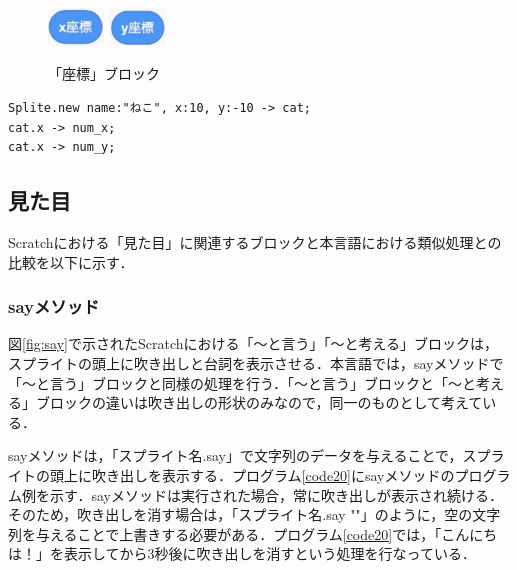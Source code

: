 \documentclass[10pt,a4j]{ltjsarticle}
\begin{document}
\begin{figure}[H]
  \centering
  \includegraphics[height=10mm]{images/x.pdf} 
  \includegraphics[height=10mm]{images/y.pdf} 
  \caption{「座標」ブロック}
  \label{fig:xy}
\end{figure}

\begin{lstlisting}[caption=xメソッドとyメソッドのプログラム例, label=code19]
Splite.new name:"ねこ", x:10, y:-10 -> cat;
cat.x -> num_x;
cat.x -> num_y;
\end{lstlisting}
\subsection{見た目}
Scratchにおける「見た目」に関連するブロックと本言語における類似処理との比較を以下に示す．

\subsubsection{sayメソッド}
図\ref{fig:say}で示されたScratchにおける「〜と言う」「〜と考える」ブロックは，スプライトの頭上に吹き出しと台詞を表示させる．本言語では，sayメソッドで「〜と言う」ブロックと同様の処理を行う．「〜と言う」ブロックと「〜と考える」ブロックの違いは吹き出しの形状のみなので，同一のものとして考えている．

sayメソッドは，「スプライト名.say」で文字列のデータを与えることで，スプライトの頭上に吹き出しを表示する．プログラム\ref{code20}にsayメソッドのプログラム例を示す．sayメソッドは実行された場合，常に吹き出しが表示され続ける．そのため，吹き出しを消す場合は，「スプライト名.say ""」のように，空の文字列を与えることで上書きする必要がある．プログラム\ref{code20}では，「こんにちは！」を表示してから3秒後に吹き出しを消すという処理を行なっている．
\end{document}
